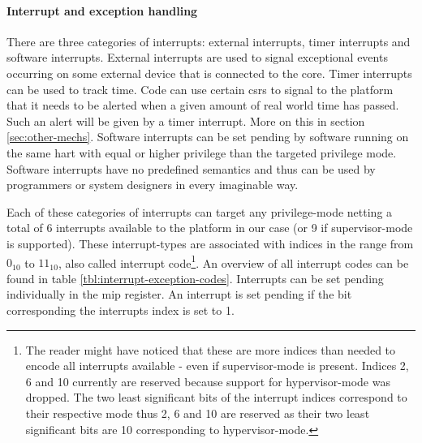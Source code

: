 \paragraph{Interrupt and exception handling}
There are three categories of interrupts: external interrupts, timer interrupts and software interrupts.
External interrupts are used to signal exceptional events occurring on some external device that is connected to the core.
Timer interrupts can be used to track time.
Code can use certain \glspl{csr} to signal to the platform that it needs to be alerted when a given amount of real world time has passed.
Such an alert will be given by a timer interrupt.
More on this in section \ref{sec:other-mechs}.
Software interrupts can be set pending by software running on the same \gls{hart} with equal or higher privilege than the targeted privilege mode.
Software interrupts have no predefined semantics and thus can be used by programmers or system designers in every imaginable way.

Each of these categories of interrupts can target any privilege-mode netting a total of 6 interrupts available to the platform in our case (or 9 if supervisor-mode is supported).
These interrupt-types are associated with indices in the range from $ 0_{10} $ to $ 11_{10} $, also called interrupt code\footnote{%
    The reader might have noticed that these are more indices than needed to encode all interrupts available - even if supervisor-mode is present.
    Indices 2, 6 and 10 currently are reserved because support for hypervisor-mode was dropped.
    The two least significant bits of the interrupt indices correspond to their respective mode thus 2, 6 and 10 are reserved as their two least significant bits are 10 corresponding to hypervisor-mode.
}.
An overview of all interrupt codes can be found in table \ref{tbl:interrupt-exception-codes}.
Interrupts can be set pending individually in the \gls{mip} register.
An interrupt is set pending if the bit corresponding the interrupts index is set to 1.

